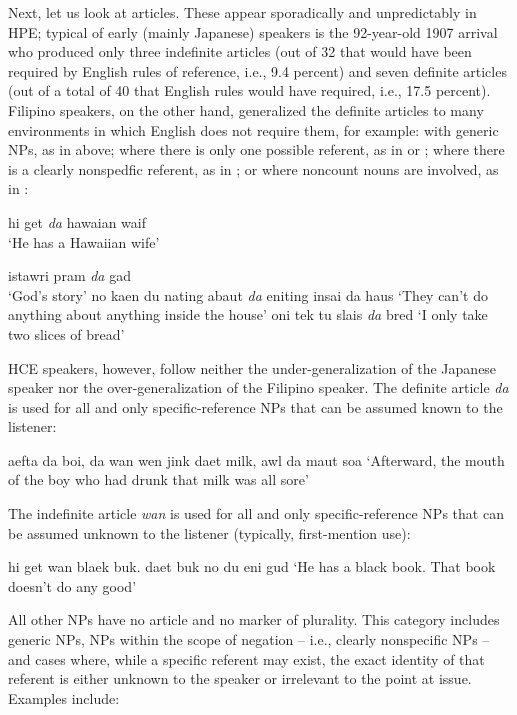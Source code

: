 Next, let us look at articles. These appear sporadically and unpredictably in HPE; typical of early (mainly Japanese) speakers is the 92-year-old 1907 arrival who produced only three indefinite articles (out of 32 that would have been required by English rules of reference, i.e., 9.4 percent) and seven definite articles (out of a total of 40 that English rules would have required, i.e., 17.5 percent). Filipino speakers, on the other hand, generalized the definite articles to many environ\-ments in which English does not require them, for example: with generic NPs, as in  above; where there is only one possible refer\-ent, as in  or ; where there is a clearly nonspedfic referent, as in ; or where noncount nouns are involved, as in :

\ea\label{ex:30}
 hi get \textit{da} hawaian waif \\
\glt  `He has a Hawaiian wife'
\z

\ea\label{ex:31}
 istawri pram \textit{da} gad\\
\glt   `God's story'
\z
\ea\label{ex:32}
 no kaen du nating abaut \textit{da} eniting insai da haus
\glt   `They can't do anything about anything inside the house'
\z
\ea\label{ex:33}
 oni tek tu slais \textit{da} bred
\glt `I only take two slices of bread'
\z

HCE speakers, however, follow neither the under-generalization of the Japanese speaker nor the over-generalization of the Filipino speaker. The definite article \textit{da} is used for all and only specific-refer\-ence NPs that can be assumed known to the listener:

\ea\label{ex:34}
 aefta da boi, da wan wen jink daet milk, awl da maut soa 
\glt `Afterward, the mouth of the boy who had drunk that milk was all sore'
\z

\noindent The indefinite article \textit{wan} is used for all and only specific-reference NPs that can be assumed unknown to the listener (typically, first-mention use):

\ea\label{ex:35}
 hi get wan blaek buk. daet buk no du eni gud
\glt `He has a black book. That book doesn't do any good'
\z

\noindent All other NPs have no article and no marker of plurality. This category includes generic NPs, NPs within the scope of negation -- i.e., clearly nonspecific NPs -- and cases where, while a specific referent may exist, the exact identity of that referent is either unknown to the speaker or irrelevant to the point at issue. Examples include:

